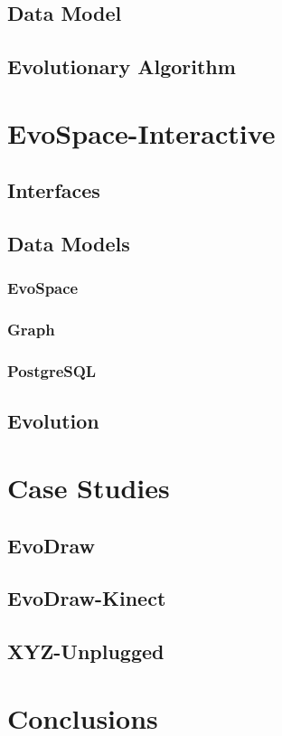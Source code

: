   \subsection{Data Model}
  \subsection{Evolutionary Algorithm}

\section{EvoSpace-Interactive}
  \subsection{Interfaces}
  \subsection{Data Models}
    \subsubsection{EvoSpace}
    \subsubsection{Graph}
    \subsubsection{PostgreSQL}
  \subsection{Evolution}

\section{Case Studies}
\subsection{EvoDraw}
\subsection{EvoDraw-Kinect}
\subsection{XYZ-Unplugged}


\section{Conclusions}

